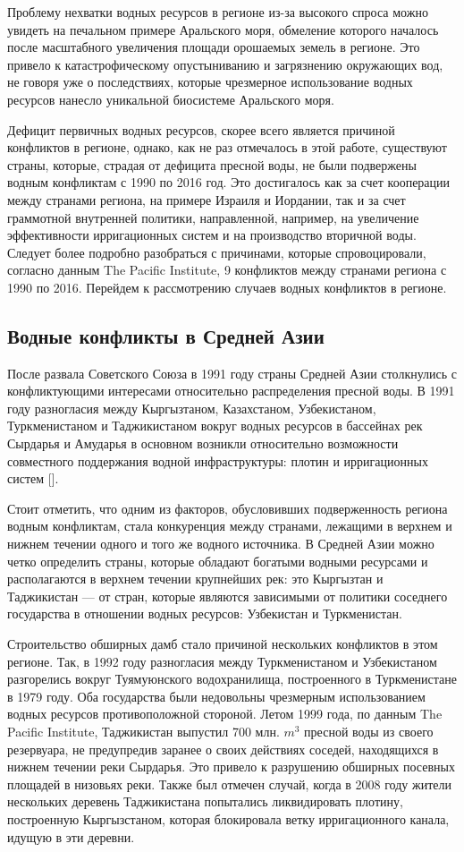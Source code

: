 \documentclass[a4paper, 12pt]{article}
\theoremstyle{plain} %
\theoremstyle{definition} %
\theoremstyle{remark} %
\begin{document}
Проблему нехватки водных ресурсов в регионе из-за высокого спроса можно увидеть на печальном примере Аральского моря, обмеление которого началось после масштабного увеличения площади орошаемых земель в регионе. Это привело к катастрофическому опустыниванию и загрязнению окружающих вод, не говоря уже о последствиях, которые чрезмерное использование водных ресурсов нанесло уникальной биосистеме Аральского моря. 

Дефицит первичных водных ресурсов, скорее всего является причиной конфликтов в регионе, однако, как не раз отмечалось в этой работе, существуют страны, которые, страдая от дефицита пресной воды, не были подвержены водным конфликтам с 1990 по 2016 год. Это достигалось как за счет кооперации между странами региона, на примере Израиля и Иордании, так и за счет граммотной внутренней политики, направленной, например, на увеличение эффективности ирригационных систем и на производство вторичной воды. Следует более подробно разобраться с причинами, которые спровоцировали, согласно данным The Pacific Institute, 9 конфликтов между странами региона с 1990 по 2016. Перейдем к рассмотрению случаев  водных конфликтов в регионе.

\subsection{Водные конфликты в Средней Азии}
После развала Советского Союза в 1991 году страны Средней Азии столкнулись с конфликтующими интересами относительно распределения пресной воды. В 1991 году разногласия между Кыргызтаном, Казахстаном, Узбекистаном, Туркменистаном и Таджикистаном вокруг водных ресурсов в бассейнах рек Сырдарья и Амударья в основном возникли относительно возможности совместного поддержания водной инфраструктуры: плотин и ирригационных систем [\cite{mosello}].

Стоит отметить, что одним из факторов, обусловивших подверженность региона водным конфликтам, стала конкуренция между странами, лежащими в верхнем и нижнем течении одного и того же водного источника. В Средней Азии можно четко определить страны, которые обладают богатыми водными ресурсами и располагаются в верхнем течении крупнейших рек: это Кыргызтан и Таджикистан --- от стран, которые являются зависимыми от политики соседнего государства в отношении водных ресурсов: Узбекистан и Туркменистан. 

Строительство обширных дамб стало причиной нескольких конфликтов в этом регионе. Так, в 1992 году разногласия между Туркменистаном и Узбекистаном разгорелись вокруг Туямуюнского водохранилища, построенного в Туркменистане в 1979 году. Оба государства были недовольны чрезмерным использованием водных ресурсов противоположной стороной. Летом 1999 года, по данным The Pacific Institute, Таджикистан выпустил 700 млн. $m^3$ пресной воды из своего резервуара, не предупредив заранее о своих действиях соседей, находящихся в нижнем течении реки Сырдарья. Это привело к разрушению обширных посевных площадей в низовьях реки. Также был отмечен случай, когда в 2008 году жители нескольких деревень Таджикистана попытались ликвидировать плотину, построенную Кыргызстаном, которая блокировала ветку ирригационного канала, идущую в эти деревни.
\end{document}
